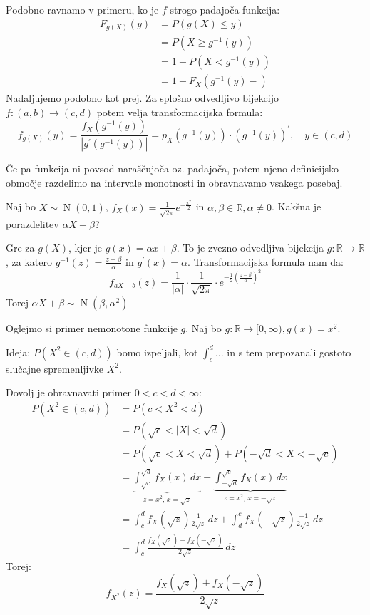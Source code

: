 \documentclass[12pt]{book}
\def\n{\noindent}
\theoremstyle{definition}
\theoremstyle{plain}
\theoremstyle{plain}
\theoremstyle{plain}
\theoremstyle{remark}
\begin{document}
\n Podobno ravnamo v primeru, ko je $f$ strogo padajoča funkcija:
$$
\begin{aligned}
    F_{g(X)}(y)&=P(g(X) \leq y) \\
    &=P\left(X \geq g^{-1}(y)\right) \\ 
    &=1-P\left(X<g^{-1}(y)\right) \\
    &=1-F_X\left(g^{-1}(y)-\right)
\end{aligned}
$$
Nadaljujemo podobno kot prej. Za splošno odvedljivo bijekcijo $f:(a,b) \to (c,d)$ potem velja transformacijska formula: 
$$
f_{g(X)}(y)=\frac{f_X\left(g^{-1}(y)\right)}{\left|g^{\prime}\left(g^{-1}(y)\right)\right|}=p_X\left(g^{-1}(y)\right) \cdot\left(g^{-1}(y)\right)^{\prime}, \quad y \in(c, d)
$$

\n Če pa funkcija ni povsod naraščujoča oz. padajoča, potem njeno definicijsko območje razdelimo na intervale monotnosti in obravnavamo vsakega posebaj. 

\begin{zgled}
    Naj bo $X \sim \operatorname{N}(0, 1)$, $f_X(x)=\frac{1}{\sqrt{2 \pi}} e^{-\frac{x^2}{2}}$ in $\alpha, \beta \in \mathbb{R}, \alpha \neq 0$. Kakšna je porazdelitev $\alpha X + \beta$?

    \n Gre za $g(X)$, kjer je $g(x)=\alpha x + \beta$. To je zvezno odvedljiva bijekcija $g:\mathbb{R} \to \mathbb{R}$, za katero $g^{-1}(z)=\frac{z-\beta}{\alpha}$ in $g^{\prime}(x)=\alpha$. Transformacijska formula nam da: 
    $$
    f_{a X+b}(z)=\frac{1}{|\alpha|} \cdot \frac{1}{\sqrt{2 \pi}} \cdot e^{-\frac{1}{2}\left(\frac{z-\beta}{\alpha}\right)^2}
    $$
    Torej $\alpha X+\beta \sim \operatorname{N}\left(\beta, \alpha^2\right)$
\end{zgled}

\begin{zgled}
    Oglejmo si primer nemonotone funkcije $g$. Naj bo $g: \mathbb{R} \rightarrow[0, \infty), g(x)=x^2$. 

    \n Ideja: $P\left(X^2 \in(c, d)\right)$ bomo izpeljali, kot $\int_c^d\ldots$ in s tem prepozanali gostoto slučajne spremenljivke $X^2$.

    \n Dovolj je obravnavati primer $0<c<d<\infty$:
    $$
    \begin{aligned}
        P\left(X^2 \in(c, d)\right)&=P\left(c<X^2<d\right) \\
        &=P(\sqrt{c}<|X|<\sqrt{d}) \\
        &=P(\sqrt{c}<X<\sqrt{d})+P(-\sqrt{d}<X<-\sqrt{c}) \\
        &=\underbrace{\int_{\sqrt{c}}^{\sqrt{d}} f_X(x) \, d x}_{z = x^2, \, x = \sqrt{z}} +\underbrace{\int_{-\sqrt{d}}^{\sqrt{c}} f_X(x) \, d x}_{z = x^2, \, x = -\sqrt{z}} \\
        &=\int_c^d f_X(\sqrt{z}) \frac{1}{2 \sqrt{z}} \, d z+\int_d^c f_X(-\sqrt{z}) \frac{-1}{2 \sqrt{z}} \, d z \\
        &=\int_c^d \frac{f_X(\sqrt{z})+f_X(-\sqrt{z})}{2 \sqrt{z}}\,  d z
    \end{aligned}
    $$
    Torej: 
    $$
    f_{X^2}(z)=\frac{f_X(\sqrt{z})+f_X(-\sqrt{z})}{2 \sqrt{z}}
    $$
\end{zgled}
\end{document}
